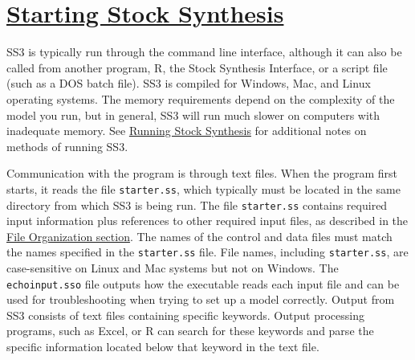 \hypertarget{StartingSS3}{}
\section[Starting Stock Synthesis]{\protect\hyperlink{StartingSS3}{Starting Stock Synthesis}}
SS3 is typically run through the command line interface, although it can also be called from another program, R, the Stock Synthesis Interface, or a script file (such as a DOS batch file). SS3 is compiled for Windows, Mac, and Linux operating systems. The memory requirements depend on the complexity of the model you run, but in general, SS3 will run much slower on computers with inadequate memory. See \hyperref[sec:RunningSS3]{Running Stock Synthesis} for additional notes on methods of running SS3.

Communication with the program is through text files. When the program first starts, it reads the file \verb|starter.ss|, which typically must be located in the same directory from which SS3 is being run. The file \verb|starter.ss| contains required input information plus references to other required input files, as described in the \hyperref[FileOrganization]{File Organization section}. The names of the control and data files must match the names specified in the \verb|starter.ss| file. File names, including \verb|starter.ss|, are case-sensitive on Linux and Mac systems but not on Windows. The \verb|echoinput.sso| file outputs how the executable reads each input file and can be used for troubleshooting when trying to set up a model correctly. Output from SS3 consists of text files containing specific keywords. Output processing programs, such as Excel, or R can search for these keywords and parse the specific information located below that keyword in the text file.

\pagebreak
